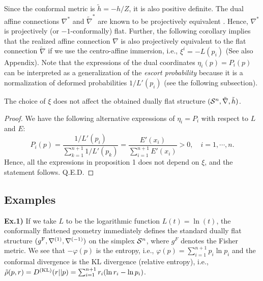 \documentclass{llncs}
\begin{document}
\begin{remark}
\label{rem:rem2}
Since the conformal metric is $\tilde h=-h/Z$, 
it is also positive definite.
The dual affine connections $\nabla^*$ and $\tilde \nabla^*$ 
are known to be projectively equivalent \cite{Kurose94}. 
Hence, $\nabla^*$ is projectively (or $-1$-conformally) flat. 
Further, the following corollary implies that 
the realized affine connection $\nabla$ is also projectively equivalent to
the flat connection $\tilde \nabla$ 
if we use the centro-affine immersion, 
i.e., $\xi^i=-L(p_i)$ \cite{NS,Kurose94} (See also Appendix).
Note that the expressions of the dual coordinates $\eta_i(p)=P_i(p)$ 
can be interpreted as a generalization of 
the {\em escort probability} \cite{Tsallis09} 
because it is a normalization of deformed probabilities $1/L'(p_i)$ 
(see the following subsection). 
\end{remark}
\begin{corollary}
The choice of $\xi$ does not affect the obtained dually flat structure 
$({\cal S}^n,\tilde \nabla, \tilde h)$.
\end{corollary}
\begin{proof}
We have the following alternative expressions of $\eta_i=P_i$ 
with respect to $L$ and $E$:
\[
	P_i(p)=\frac{1/L'(p_i)}{\displaystyle \sum_{k=1}^{n+1}1/L'(p_k)}
=\frac{E'(x_i)}{\displaystyle \sum_{i=1}^{n+1} E'(x_i)} >0, \quad i=1,\cdots,n.
\]
Hence, all the expressions in proposition 1 does not depend on $\xi$, and 
the statement follows.
\hfill Q.E.D.
\end{proof}

\subsection{Examples}
\label{sec:example}
{\bf Ex.1)} If we take $L$ to be the logarithmic function $L(t)=\ln (t)$, 
the conformally flattened geometry immediately defines 
the standard dually flat structure %
$(g^{\rm F},\nabla^{(1)},\nabla^{(-1)})$ on the simplex ${\cal S}^n$,
where $g^F$ denotes the Fisher metric.
We see that $-\varphi(p)$ is the entropy, i.e., 
$\varphi(p)=\sum_{i=1}^{n+1} p_i \ln p_i$ and 
the conformal divergence is the KL divergence (relative entropy), i.e., 
$\tilde \rho(p,r)=D^{({\rm KL})}(r||p)=\sum_{i=1}^{n+1} r_i (\ln r_i-\ln p_i)$.
\end{document}
